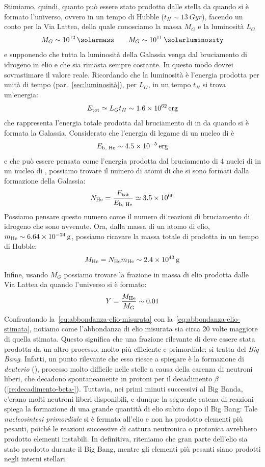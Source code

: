 Stimiamo, quindi, quanto  può essere stato prodotto dalle stella da quando si è formato l'universo, ovvero in un tempo di Hubble ($t_H \sim \SI{13}{Gyr}$), facendo un conto per la Via Lattea, della quale conosciamo la massa $M_G$ e la luminosità $L_G$
\[
M_G \sim \SI{e12}{\solarmass} \qquad M_G \sim \SI{e11}{\solarluminosity}
\]
e supponendo che tutta la luminosità della Galassia venga dal bruciamento di idrogeno in elio e che sia rimasta sempre costante. In questo modo dovrei sovrastimare il valore reale. Ricordando che la luminosità è l'energia prodotta per unità di tempo (par.~\ref{sec:luminosità}), per $L_G$, in un tempo $t_H$ si trova un'energia:
\[
E_\textup{tot} \simeq L_G t_H \sim \SI{1.6e62}{erg}
\]
che rappresenta l'energia totale prodotta dal bruciamento di  in  da quando si è formata la Galassia. Considerato che l'energia di legame di un nucleo di  è
\[
E_\textup{b, He} \sim \SI{4.5e-5}{erg}
\]
e che può essere pensata come l'energia prodotta dal bruciamento di 4 nuclei di  in un nucleo di , possiamo trovare il numero di atomi di  che si sono formati dalla formazione della Galassia:
\[
N_\textup{He} = \frac{E_\textup{tot}}{E_\textup{b, He}} \simeq \SI{3.5e66}{}
\]
Possiamo pensare questo numero come il numero di reazioni di bruciamento di idrogeno che sono avvenute. Ora, dalla massa di un atomo di elio, $m_\textup{He} \sim \SI{6.64e-24}{g}$, possiamo ricavare la massa totale di  prodotta in un tempo di Hubble:
\[
M_\textup{He} = N_\textup{He} m_\textup{He} \sim \SI{2.4e43}{g}
\]
Infine, usando $M_G$ possiamo trovare la frazione in massa di elio prodotta dalle Via Lattea da quando l'universo si è formato:
\begin{equation}\label{eq:abbondanza-elio-stimata}
Y = \frac{M_\textup{He}}{M_G} \sim 0.01
\end{equation}
Confrontando la~\eqref{eq:abbondanza-elio-misurata} con la~\eqref{eq:abbondanza-elio-stimata}, notiamo come l'abbondanza di elio misurata sia circa 20 volte maggiore di quella stimata. Questo significa che una frazione rilevante di  deve essere stata prodotta da un altro processo, molto più efficiente e primordiale: si tratta del \emph{Big Bang}. Infatti, un punto rilevante che esso riesce a spiegare è la formazione di \emph{deuterio} (), processo molto difficile nelle stelle a causa della carenza di neutroni liberi, che decadono spontaneamente in protoni per il decadimento $\beta^-$ (\ref{re:decadimento-beta-}). Tuttavia, nei primi minuti successivi al Big Banda, c'erano molti neutroni liberi disponibili, e dunque la seguente catena di reazioni spiega la formazione di una grande quantità di elio subito dopo il Big Bang:
Tale \emph{nucleosintesi primordiale} si è fermata all'elio e non ha prodotto elementi più pesanti, poiché le reazioni successive di cattura neutronica o protonica avrebbero prodotto elementi instabili. In definitiva, riteniamo che gran parte dell'elio sia stato prodotto durante il Big Bang, mentre gli elementi più pesanti siano prodotti negli interni stellari.
 
